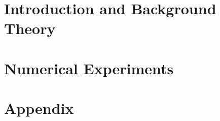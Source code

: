 
\addtolength{\evensidemargin}{-12mm}

%
%
\part[Introduction and Background Theory]{Introduction and Background Theory}
\label{part:introAndBackgroundTheory}




\part[Numerical Experiments]{Numerical Experiments}
\label{part:body}




%
%
\part*{Appendix}

\appendix %


